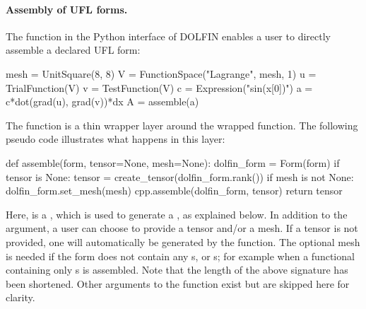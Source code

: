 \paragraph{Assembly of UFL forms.}

The  function in the Python interface of DOLFIN enables
a user to directly assemble a declared UFL form:
\begin{python}
mesh = UnitSquare(8, 8)
V = FunctionSpace("Lagrange", mesh, 1)
u = TrialFunction(V)
v = TestFunction(V)
c = Expression("sin(x[0])")
a = c*dot(grad(u), grad(v))*dx
A = assemble(a)
\end{python}
The  function is a thin wrapper layer around the wrapped
 function. The following pseudo code illustrates what
happens in this layer:
\begin{python}
def assemble(form, tensor=None, mesh=None):
    dolfin_form = Form(form)
    if tensor is None:
        tensor = create_tensor(dolfin_form.rank())
    if mesh is not None:
        dolfin_form.set_mesh(mesh)
    cpp.assemble(dolfin_form, tensor)
    return tensor
\end{python}
Here,  is a , which is used to generate a
, as explained below. In addition to the 
argument, a user can choose to provide a tensor and/or a mesh. If a
tensor is not provided, one will automatically be generated by the
 function. The optional mesh is needed if the form
does not contain any s, or s; for example
when a functional containing only s is assembled. Note
that the length of the above signature has been shortened. Other
arguments to the  function exist but are skipped here
for clarity.

